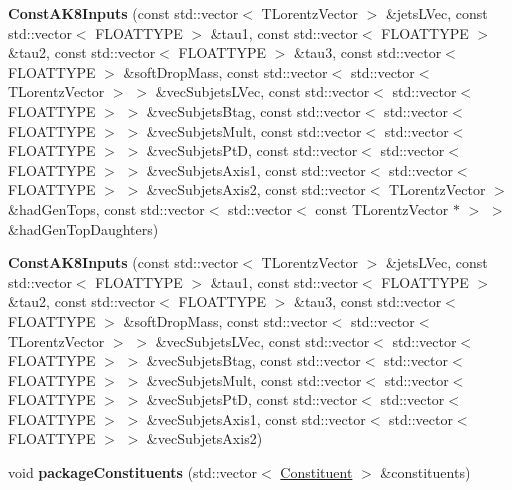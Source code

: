 \begin{DoxyCompactItemize}
\item 
\hypertarget{classttUtility_1_1ConstAK8Inputs_a727008c535477f073ac67376a7f20179}{{\bfseries Const\-A\-K8\-Inputs} (const std\-::vector$<$ T\-Lorentz\-Vector $>$ \&jets\-L\-Vec, const std\-::vector$<$ F\-L\-O\-A\-T\-T\-Y\-P\-E $>$ \&tau1, const std\-::vector$<$ F\-L\-O\-A\-T\-T\-Y\-P\-E $>$ \&tau2, const std\-::vector$<$ F\-L\-O\-A\-T\-T\-Y\-P\-E $>$ \&tau3, const std\-::vector$<$ F\-L\-O\-A\-T\-T\-Y\-P\-E $>$ \&soft\-Drop\-Mass, const std\-::vector$<$ std\-::vector$<$ T\-Lorentz\-Vector $>$ $>$ \&vec\-Subjets\-L\-Vec, const std\-::vector$<$ std\-::vector$<$ F\-L\-O\-A\-T\-T\-Y\-P\-E $>$ $>$ \&vec\-Subjets\-Btag, const std\-::vector$<$ std\-::vector$<$ F\-L\-O\-A\-T\-T\-Y\-P\-E $>$ $>$ \&vec\-Subjets\-Mult, const std\-::vector$<$ std\-::vector$<$ F\-L\-O\-A\-T\-T\-Y\-P\-E $>$ $>$ \&vec\-Subjets\-Pt\-D, const std\-::vector$<$ std\-::vector$<$ F\-L\-O\-A\-T\-T\-Y\-P\-E $>$ $>$ \&vec\-Subjets\-Axis1, const std\-::vector$<$ std\-::vector$<$ F\-L\-O\-A\-T\-T\-Y\-P\-E $>$ $>$ \&vec\-Subjets\-Axis2, const std\-::vector$<$ T\-Lorentz\-Vector $>$ \&had\-Gen\-Tops, const std\-::vector$<$ std\-::vector$<$ const T\-Lorentz\-Vector $\ast$ $>$ $>$ \&had\-Gen\-Top\-Daughters)}\label{classttUtility_1_1ConstAK8Inputs_a727008c535477f073ac67376a7f20179}

\item 
\hypertarget{classttUtility_1_1ConstAK8Inputs_a1376ef57da464077cf28555182ac6ed0}{{\bfseries Const\-A\-K8\-Inputs} (const std\-::vector$<$ T\-Lorentz\-Vector $>$ \&jets\-L\-Vec, const std\-::vector$<$ F\-L\-O\-A\-T\-T\-Y\-P\-E $>$ \&tau1, const std\-::vector$<$ F\-L\-O\-A\-T\-T\-Y\-P\-E $>$ \&tau2, const std\-::vector$<$ F\-L\-O\-A\-T\-T\-Y\-P\-E $>$ \&tau3, const std\-::vector$<$ F\-L\-O\-A\-T\-T\-Y\-P\-E $>$ \&soft\-Drop\-Mass, const std\-::vector$<$ std\-::vector$<$ T\-Lorentz\-Vector $>$ $>$ \&vec\-Subjets\-L\-Vec, const std\-::vector$<$ std\-::vector$<$ F\-L\-O\-A\-T\-T\-Y\-P\-E $>$ $>$ \&vec\-Subjets\-Btag, const std\-::vector$<$ std\-::vector$<$ F\-L\-O\-A\-T\-T\-Y\-P\-E $>$ $>$ \&vec\-Subjets\-Mult, const std\-::vector$<$ std\-::vector$<$ F\-L\-O\-A\-T\-T\-Y\-P\-E $>$ $>$ \&vec\-Subjets\-Pt\-D, const std\-::vector$<$ std\-::vector$<$ F\-L\-O\-A\-T\-T\-Y\-P\-E $>$ $>$ \&vec\-Subjets\-Axis1, const std\-::vector$<$ std\-::vector$<$ F\-L\-O\-A\-T\-T\-Y\-P\-E $>$ $>$ \&vec\-Subjets\-Axis2)}\label{classttUtility_1_1ConstAK8Inputs_a1376ef57da464077cf28555182ac6ed0}

\item 
\hypertarget{classttUtility_1_1ConstAK8Inputs_a43432eb98408e074ba5a2f329cd35028}{void {\bfseries package\-Constituents} (std\-::vector$<$ \hyperlink{classConstituent}{Constituent} $>$ \&constituents)}\label{classttUtility_1_1ConstAK8Inputs_a43432eb98408e074ba5a2f329cd35028}


\end{DoxyCompactItemize}
